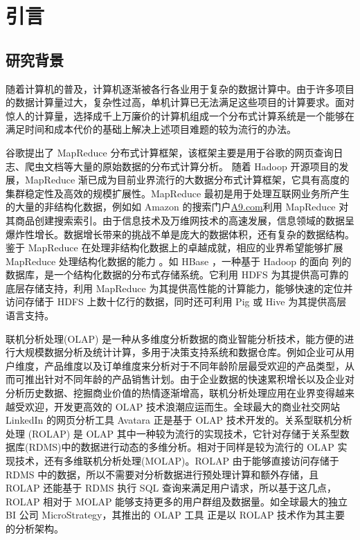 \chapter{引言}

\section{研究背景}
随着计算机的普及，计算机逐渐被各行各业用于复杂的数据计算中。由于许多项目的数据计算量过大，复杂性过高，单机计算已无法满足这些项目的计算要求。面对惊人的计算量，选择成千上万廉价的计算机组成一个分布式计算系统是一个能够在满足时间和成本代价的基础上解决上述项目难题的较为流行的办法。

谷歌提出了 MapReduce \cite{dean2008mapreduce}分布式计算框架，该框架主要是用于谷歌的网页查询日志、爬虫文档等大量的原始数据的分布式计算分析。 随着 Hadoop \cite{hadoop}开源项目的发展，MapReduce 渐已成为目前业界流行的大数据分布式计算框架，它具有高度的集群稳定性及高效的规模扩展性。MapReduce 最初是用于处理互联网业务所产生的大量的非结构化数据，例如如 Amazon 的搜索门户\url{A9.com}利用 MapReduce 对其商品创建搜索索引。由于信息技术及万维网技术的高速发展，信息领域的数据呈爆炸性增长。数据增长带来的挑战不单是庞大的数据体积，还有复杂的数据结构。鉴于 MapReduce 在处理非结构化数据上的卓越成就，相应的业界希望能够扩展 MapReduce 处理结构化数据的能力 \cite{hbase} \cite{abouzeid2009hadoopdb} \cite{buck2011scihadoop} \cite{pig} \cite{hive}。如 HBase \cite{hbase}，一种基于 Hadoop 的面向
列的数据库，是一个结构化数据的分布式存储系统。它利用 HDFS 为其提供高可靠的底层存储支持，利用 MapReduce 为其提供高性能的计算能力，能够快速的定位并访问存储于 HDFS 上数十亿行的数据，同时还可利用 Pig \cite{pig} 或 Hive \cite{hive} 为其提供高层语言支持。


联机分析处理(OLAP) \cite{chaudhuri1997overview} 是一种从多维度分析数据的商业智能分析技术，能方便的进行大规模数据分析及统计计算，多用于决策支持系统和数据仓库。例如企业可从用户维度，产品维度以及订单维度来分析对于不同年龄阶层最受欢迎的产品类型，从而可推出针对不同年龄的产品销售计划。由于企业数据的快速累积增长以及企业对分析历史数据、挖掘商业价值的热情逐渐增高，联机分析处理应用在业界变得越来越受欢迎，开发更高效的 OLAP 技术浪潮应运而生。全球最大的商业社交网站 LinkedIn 的网页分析工具 Avatara \cite{wu2012avatara} 正是基于 OLAP 技术开发的。关系型联机分析处理 (ROLAP) \cite{pedersen2001multidimensional}是 OLAP 其中一种较为流行的实现技术，它针对存储于关系型数据库(RDMS)中的数据进行动态的多维分析。相对于同样是较为流行的 OLAP 实现技术，还有多维联机分析处理(MOLAP)。ROLAP 由于能够直接访问存储于 RDMS 中的数据，所以不需要对分析数据进行预处理计算和额外存储，且 ROLAP 还能基于 RDMS 执行 SQL 查询来满足用户请求，所以基于这几点，ROLAP 相对于 MOLAP 能够支持更多的用户群组及数据量。如全球最大的独立 BI 公司 MicroStrategy，其推出的 OLAP 工具 \cite{msolapservice} 正是以 ROLAP 技术作为其主要的分析架构。


